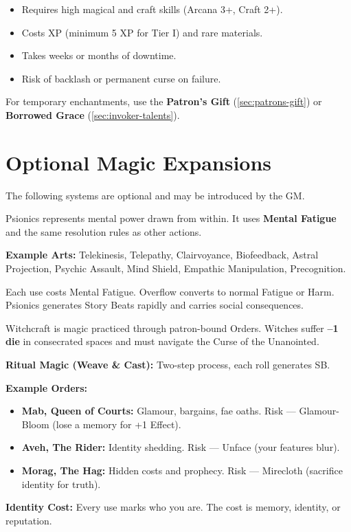 \begin{itemize}
  \item Requires high magical and craft skills (Arcana 3+, Craft 2+).
  \item Costs XP (minimum 5 XP for Tier I) and rare materials.
  \item Takes weeks or months of downtime.
  \item Risk of backlash or permanent curse on failure.
\end{itemize}

For temporary enchantments, use the \textbf{Patron’s Gift} (\ref{sec:patrons-gift}) or \textbf{Borrowed Grace} (\ref{sec:invoker-talents}).

\section{Optional Magic Expansions}
\label{sec:optional-magic}

The following systems are optional and may be introduced by the GM.

\begin{tcolorbox}[colback=blue!5!white,colframe=blue!75!black,title=Psionics (Optional)]
Psionics represents mental power drawn from within. It uses \textbf{Mental Fatigue} and the same resolution rules as other actions.

\medskip
\textbf{Example Arts:} Telekinesis, Telepathy, Clairvoyance, Biofeedback, Astral Projection, Psychic Assault, Mind Shield, Empathic Manipulation, Precognition.

\medskip
Each use costs Mental Fatigue. Overflow converts to normal Fatigue or Harm. Psionics generates Story Beats rapidly and carries social consequences.
\end{tcolorbox}

\begin{tcolorbox}[colback=green!5!white,colframe=green!75!black,title=Witchcraft (Optional)]
Witchcraft is magic practiced through patron-bound Orders. Witches suffer \textbf{–1 die} in consecrated spaces and must navigate the Curse of the Unanointed.

\medskip
\noindent
\textbf{Ritual Magic (Weave \& Cast):} Two-step process, each roll generates SB.

\medskip
\noindent
\textbf{Example Orders:}
\begin{itemize}
  \item \textbf{Mab, Queen of Courts:} Glamour, bargains, fae oaths. Risk — Glamour-Bloom (lose a memory for +1 Effect).
  \item \textbf{Aveh, The Rider:} Identity shedding. Risk — Unface (your features blur).
  \item \textbf{Morag, The Hag:} Hidden costs and prophecy. Risk — Mirecloth (sacrifice identity for truth).
\end{itemize}

\noindent
\textbf{Identity Cost:} Every use marks who you are. The cost is memory, identity, or reputation.
\end{tcolorbox}

